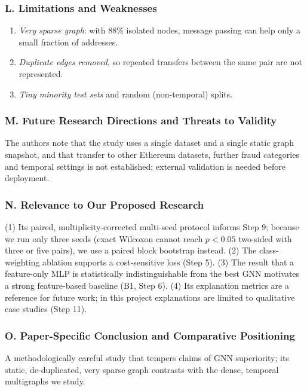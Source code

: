 \documentclass[11pt,a4paper]{article}
\begin{document}
\subsubsection*{L. Limitations and Weaknesses}
\begin{enumerate}[leftmargin=*]
    \item \textit{Very sparse graph}: with 88\% isolated nodes, message passing can help only a small fraction of addresses.
    \item \textit{Duplicate edges removed}, so repeated transfers between the same pair are not represented.
    \item \textit{Tiny minority test sets} and random (non-temporal) splits.
\end{enumerate}

\subsubsection*{M. Future Research Directions and Threats to Validity}
The authors note that the study uses a single dataset and a single static graph snapshot, and that transfer to other Ethereum datasets, further fraud categories and temporal settings is not established; external validation is needed before deployment.

\subsubsection*{N. Relevance to Our Proposed Research}
(1) Its paired, multiplicity-corrected multi-seed protocol informs Step 9; because we run only three seeds (exact Wilcoxon cannot reach $p<0.05$ two-sided with three or five pairs), we use a paired block bootstrap instead. (2) The class-weighting ablation supports a cost-sensitive loss (Step 5). (3) The result that a feature-only MLP is statistically indistinguishable from the best GNN motivates a strong feature-based baseline (B1, Step 6). (4) Its explanation metrics are a reference for future work; in this project explanations are limited to qualitative case studies (Step 11).

\subsubsection*{O. Paper-Specific Conclusion and Comparative Positioning}
A methodologically careful study that tempers claims of GNN superiority; its static, de-duplicated, very sparse graph contrasts with the dense, temporal multigraphs we study.
\end{document}
